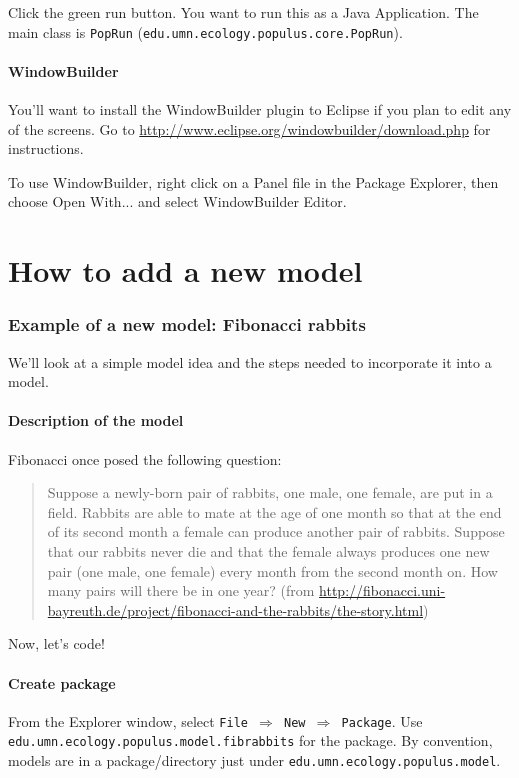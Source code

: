 \documentclass[12pt]{article}
\begin{document}
Click the green run button.  You want to run this as a Java Application.  The main class is \texttt{PopRun} (\texttt{edu.umn.ecology.populus.core.PopRun}).

\subsection{WindowBuilder}
You'll want to install the WindowBuilder plugin to Eclipse if you plan to edit any of the screens.  Go to \url{http://www.eclipse.org/windowbuilder/download.php} for instructions.

To use WindowBuilder, right click on a Panel file in the Package Explorer, then choose Open With... and select WindowBuilder Editor.

\part{How to add a new model}
\section{Example of a new model: Fibonacci rabbits}

We'll look at a simple model idea and the steps needed to incorporate it into a model.

\subsection{Description of the model}
Fibonacci once posed the following question:

\begin{quote}
Suppose a newly-born pair of rabbits, one male, one female, are put in a field. Rabbits are able to mate at the age of one month so that at the end of its second month a female can produce another pair of rabbits. Suppose that our rabbits never die and that the female always produces one new pair (one male, one female) every month from the second month on. How many pairs will there be in one year?  (from \url{http://fibonacci.uni-bayreuth.de/project/fibonacci-and-the-rabbits/the-story.html})
\end{quote}

Now, let's code!

\subsection{Create package}
From the Explorer window, select \texttt{File $\Rightarrow$ New $\Rightarrow$ Package}.
Use \texttt{edu.umn.ecology.populus.model.fibrabbits} for the package.  By convention, models are in a package/directory just under \texttt{edu.umn.ecology.populus.model}.
\end{document}
